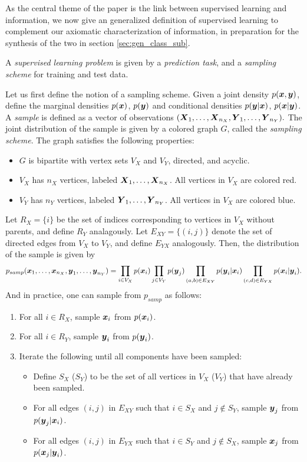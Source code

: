 \documentclass[12pt]{article}
\begin{document}
As the central theme of the paper is the link between supervised
learning and information, we now give an generalized definition of
supervised learning to complement our axiomatic characterization of
information, in preparation for the synthesis of the two in
section \ref{sec:gen_class_sub}.

A \emph{supervised learning problem} is given by a \emph{prediction
task}, and a \emph{sampling scheme} for training and test data.

Let us first define the notion of a sampling scheme.  Given a joint
density $p(\boldsymbol{x}, \boldsymbol{y})$, define the marginal densities $p(\boldsymbol{x})$,
$p(\boldsymbol{y})$ and conditional densities $p(\boldsymbol{y}|\boldsymbol{x})$, $p(\boldsymbol{x}|\boldsymbol{y})$.
A \emph{sample} is defined as a vector of observations
$(\boldsymbol{X}_1,\hdots, \boldsymbol{X}_{n_X}, \boldsymbol{Y}_1,\hdots, \boldsymbol{Y}_{n_Y}).$ The joint
distribution of the sample is given by a colored graph $G$,
called the \emph{sampling scheme}.  The graph satisfies the following properties:
\begin{itemize}
\item $G$ is bipartite with vertex sets $V_X$ and $V_Y$, directed, and acyclic.
\item $V_X$ has $n_X$ vertices, labeled $\boldsymbol{X}_1,\hdots, \boldsymbol{X}_{n_X}$.  All vertices in $V_X$ are colored red.
\item $V_Y$ has $n_Y$ vertices, labeled $\boldsymbol{Y}_1,\hdots, \boldsymbol{Y}_{n_Y}$.  All vertices in $V_X$ are colored blue.
\end{itemize}
Let $R_X = \{i\}$ be the set of indices corresponding to vertices in
$V_X$ without parents, and define $R_Y$ analagously.  Let $E_{XY}
= \{(i, j)\}$ denote the set of directed edges from $V_X$ to $V_Y$,
and define $E_{YX}$ analogously.  Then, the distribution of the sample
is given by
\[
p_{samp}(\boldsymbol{x}_1,\hdots, \boldsymbol{x}_{n_X}, \boldsymbol{y}_1,\hdots, \boldsymbol{y}_{n_Y}) 
= \prod_{i \in V_X} p(\boldsymbol{x}_i) \prod_{j \in V_Y} p(\boldsymbol{y}_j) \prod_{(a, b) \in E_{XY}} p(\boldsymbol{y}_i|\boldsymbol{x}_i) \prod_{(c,d) \in E_{YX}} p(\boldsymbol{x}_i|\boldsymbol{y}_i).
\]
And in practice, one can sample from $p_{samp}$ as follows:
\begin{enumerate}
\item For all $i \in R_X$, sample $\boldsymbol{x}_i$ from $p(\boldsymbol{x}_i)$.
\item For all $i \in R_Y$, sample $\boldsymbol{y}_i$ from $p(\boldsymbol{y}_i)$.
\item Iterate the following until all components have been sampled:
\begin{itemize}
\item Define $S_X$ ($S_Y$) to be the set of all vertices in $V_X$ ($V_Y$) that have already been sampled.
\item For all edges $(i, j)$ in $E_{XY}$ such that $i \in S_X$ and $j \notin S_Y$, sample $\boldsymbol{y}_j$ from $p(\boldsymbol{y}_j|\boldsymbol{x}_i)$.
\item For all edges $(i, j)$ in $E_{YX}$ such that $i \in S_Y$ and $j \notin S_X$, sample $\boldsymbol{x}_j$ from $p(\boldsymbol{x}_j|\boldsymbol{y}_i)$.
\end{itemize}
\end{enumerate}
\end{document}
